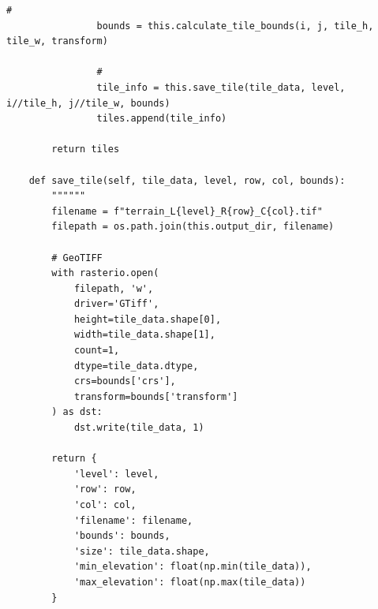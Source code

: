\begin{lstlisting}[style=python]
                # 
                bounds = this.calculate_tile_bounds(i, j, tile_h, tile_w, transform)
                
                # 
                tile_info = this.save_tile(tile_data, level, i//tile_h, j//tile_w, bounds)
                tiles.append(tile_info)
                
        return tiles
    
    def save_tile(self, tile_data, level, row, col, bounds):
        """"""
        filename = f"terrain_L{level}_R{row}_C{col}.tif"
        filepath = os.path.join(this.output_dir, filename)
        
        # GeoTIFF
        with rasterio.open(
            filepath, 'w',
            driver='GTiff',
            height=tile_data.shape[0],
            width=tile_data.shape[1],
            count=1,
            dtype=tile_data.dtype,
            crs=bounds['crs'],
            transform=bounds['transform']
        ) as dst:
            dst.write(tile_data, 1)
        
        return {
            'level': level,
            'row': row, 
            'col': col,
            'filename': filename,
            'bounds': bounds,
            'size': tile_data.shape,
            'min_elevation': float(np.min(tile_data)),
            'max_elevation': float(np.max(tile_data))
        }
\end{lstlisting}

\hypertarget{section-74}{%
\paragraph{}\label{section-74}}

